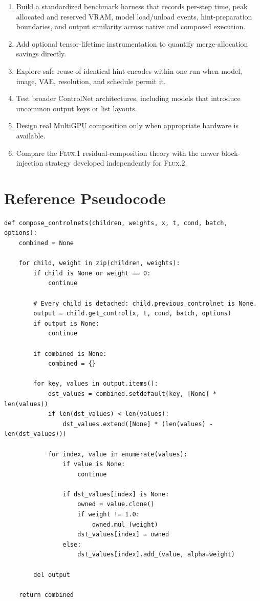\documentclass[11pt]{article}
\newcommand{\FluxOne}{\textsc{Flux.1}}
\newcommand{\FluxTwo}{\textsc{Flux.2}}
\begin{document}
\begin{enumerate}
  \item Build a standardized benchmark harness that records per-step time, peak allocated and reserved VRAM, model load/unload events, hint-preparation boundaries, and output similarity across native and composed execution.
  \item Add optional tensor-lifetime instrumentation to quantify merge-allocation savings directly.
  \item Explore safe reuse of identical hint encodes within one run when model, image, VAE, resolution, and schedule permit it.
  \item Test broader ControlNet architectures, including models that introduce uncommon output keys or list layouts.
  \item Design real MultiGPU composition only when appropriate hardware is available.
  \item Compare the \FluxOne{} residual-composition theory with the newer block-injection strategy developed independently for \FluxTwo{}.
\end{enumerate}

\appendix

\section{Reference Pseudocode}

\begin{lstlisting}[style=pythonstyle,caption={Complete conceptual non-recursive fusion.}]
def compose_controlnets(children, weights, x, t, cond, batch, options):
    combined = None

    for child, weight in zip(children, weights):
        if child is None or weight == 0:
            continue

        # Every child is detached: child.previous_controlnet is None.
        output = child.get_control(x, t, cond, batch, options)
        if output is None:
            continue

        if combined is None:
            combined = {}

        for key, values in output.items():
            dst_values = combined.setdefault(key, [None] * len(values))
            if len(dst_values) < len(values):
                dst_values.extend([None] * (len(values) - len(dst_values)))

            for index, value in enumerate(values):
                if value is None:
                    continue

                if dst_values[index] is None:
                    owned = value.clone()
                    if weight != 1.0:
                        owned.mul_(weight)
                    dst_values[index] = owned
                else:
                    dst_values[index].add_(value, alpha=weight)

        del output

    return combined
\end{lstlisting}
\end{document}
